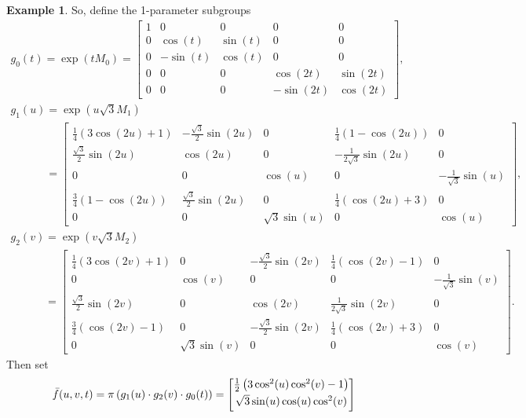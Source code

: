 \documentclass[10pt,a4paper]{amsart}
\numberwithin{equation}{section}
\theoremstyle{definition}
\newtheorem{exmpl}[teo]{Example}
\begin{document}
\begin{exmpl}
So, def\/ine the 1-parameter subgroups
\begin{gather*}
g_0(t)=\exp(tM_0) =
\begin{bmatrix}
1 & 0 & 0 & 0 & 0
\\
0 & \cos(t) & \sin(t) & 0 & 0
\\
0 & -\sin(t) & \cos(t) & 0 & 0
\\
0 & 0 & 0 & \cos(2t) & \sin(2t)
\\
0 & 0 & 0 & -\sin(2t) & \cos(2t)
\end{bmatrix},
\\
g_1(u)=\exp(u \sqrt{3} M_1)
\\
\phantom{g_1(u)}
=
\begin{bmatrix}
\tfrac{1}{4}(3 \cos(2u) + 1) & -\tfrac{\sqrt{3}}{2}\sin(2u) & 0 & \tfrac{1}{4} (1 - \cos(2u)) & 0
\\
\tfrac{\sqrt{3}}{2}\sin(2u) & \cos(2u) & 0 & -\tfrac{1}{2\sqrt{3}} \sin(2u) & 0
\\
0 & 0 & \cos(u) & 0 & -\tfrac{1}{\sqrt{3}} \sin(u)
\\
\tfrac{3}{4}(1 - \cos(2u)) & \tfrac{\sqrt{3}}{2}\sin(2u) & 0 & \tfrac{1}{4}(\cos(2u) + 3) & 0
\\
0 & 0 & \sqrt{3} \sin(u) & 0 & \cos(u)
\end{bmatrix},
\\
g_2(v)=\exp(v \sqrt{3} M_2)
\\
\phantom{g_2(v)}
=
\begin{bmatrix}
\tfrac{1}{4}(3 \cos(2v) + 1) & 0 & -\tfrac{\sqrt{3}}{2}\sin(2v) & \tfrac{1}{4} (\cos(2v) - 1) & 0
\\
0 & \cos(v) & 0 & 0 & -\tfrac{1}{\sqrt{3}}\sin(v)
\\
\tfrac{\sqrt{3}}{2}\sin(2v) & 0 & \cos(2v) & \tfrac{1}{2\sqrt{3}} \sin(2v) & 0
\\
\tfrac{3}{4}(\cos(2v) - 1) & 0 & -\tfrac{\sqrt{3}}{2}\sin(2v) & \tfrac{1}{4}(\cos(2v) + 3) & 0
\\
0 & \sqrt{3} \sin(v) & 0 & 0 & \cos(v)
\end{bmatrix}.
\end{gather*}
Then set
\begin{gather}
\bar{f}(u,v,t) = \pi\left(g_1(u) \cdot g_2(v) \cdot g_0(t) \right) =
\begin{bmatrix}
\tfrac{1}{2}\left(3\cos^2(u)\cos^2(v) - 1 \right)
\vspace{1mm}\\
\sqrt{3} \sin(u) \cos(u) \cos^2(v)
\vspace{1mm}\\

\end{bmatrix}
\end{gather}
\end{exmpl}
\end{document}
